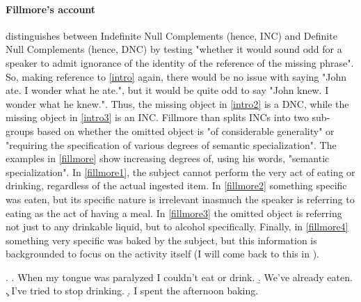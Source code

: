 \paragraph{Fillmore's account}
\textcite[96]{Fillmore1986} distinguishes between Indefinite Null Complements (hence, INC) and Definite Null Complements (hence, DNC) by testing "whether it would sound odd for a speaker to admit ignorance of the identity of the reference of the missing phrase". So, making reference to \ref{intro} again, there would be no issue with saying "John ate. I wonder what he ate.", but it would be quite odd to say "John knew. I wonder what he knew.". Thus, the missing object in \ref{intro2} is a DNC, while the missing object in \ref{intro3} is an INC. Fillmore than splits INCs into two sub-groups based on whether the omitted object is "of considerable generality" or "requiring the specification of various degrees of semantic specialization". The examples in \ref{fillmore} \parencite[96-97]{Fillmore1986} show increasing degrees of, using his words, "semantic specialization". In \ref{fillmore1}, the subject cannot perform the very act of eating or drinking, regardless of the actual ingested item. In \ref{fillmore2} something specific was eaten, but its specific nature is irrelevant inasmuch the speaker is referring to eating as the act of having a meal. In \ref{fillmore3} the omitted object is referring not just to any drinkable liquid, but to alcohol specifically. Finally, in \ref{fillmore4} something very specific was baked by the subject, but this information is backgrounded to focus on the activity itself (I will come back to this in ).

\ex. \label{fillmore} \a. \label{fillmore1} When my tongue was paralyzed I couldn't eat or drink.
\b. \label{fillmore2} We've already eaten.
\c. \label{fillmore3} I've tried to stop drinking.
\d. \label{fillmore4} I spent the afternoon baking.

